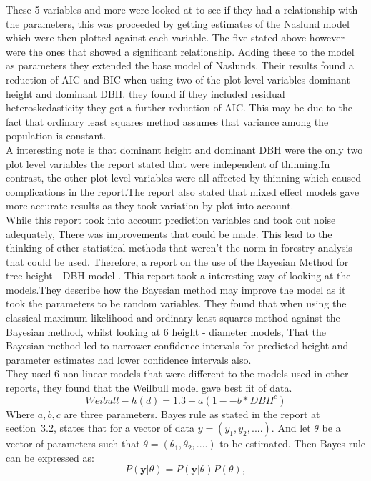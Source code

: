 \documentclass[a4paper,11pt,twoside]{report}
\begin{document}
These 5 variables and more were looked at to see if they had a relationship with the parameters, this was proceeded by getting estimates of the Naslund model which were then plotted against each variable. The five stated above however were the ones that showed a significant relationship.
Adding these to the model as parameters they extended the base model of Naslunds.
Their results found a reduction of AIC and BIC when using two of the plot level variables dominant height and dominant DBH. they found if they included residual heteroskedasticity they got a further reduction of AIC.
This may be due to the fact that ordinary least squares method assumes that variance among the population is constant.\\
A interesting note is that dominant height and dominant DBH were the only two plot level variables the report stated that were independent of thinning.In contrast, the other plot level variables were all affected by thinning which caused complications in the report.The report also stated that mixed effect models gave more accurate results as they took variation by plot into account.\\
While this report took into account prediction variables and took out noise adequately, There was improvements that could be made. This lead to the thinking of other statistical methods that weren't the norm in forestry analysis that could be used. Therefore, a report on the use of the Bayesian Method for tree height - DBH model \cite{BayesModel}.
This report took a interesting way of looking at the models.They describe how the Bayesian method may improve the model as it took the parameters to be random variables. They found that when using the classical maximum likelihood and ordinary least squares method against the Bayesian method, whilst looking at 6 height - diameter models, That the Bayesian method led to narrower confidence intervals for predicted height and parameter estimates had lower confidence intervals also.\\
They used 6 non linear models that were different to the models used in other reports, they found that the Weilbull model gave best fit of data.\begin{equation}
Weibull-  h(d) = 1.3 + a(1-{-b*DBH^c})
\end{equation}
Where $a,b,c$ are three parameters.
Bayes rule as stated in the report at section~3.2\cite{BayesModel},
states that for a vector of data $y= (y_1,y_2,....)$.
And let $\theta$ be a vector of parameters such that $\theta = (\theta_1,\theta_2,....)$ to be estimated. Then Bayes rule can be expressed as:\begin{equation}
\label{eq:Bayes rule}
P(\textbf{y}|\theta) = P(\textbf{y} |\theta)P(\theta ),
\end{equation}
\end{document}
